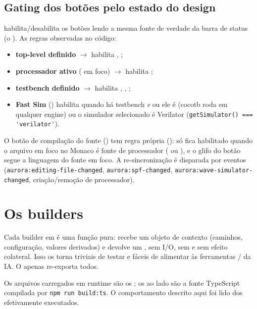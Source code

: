\subsection{Gating dos botões pelo estado do design}
\label{sec:08-gating}

 habilita/desabilita os botões lendo a mesma fonte
de verdade da barra de status (o ). As regras observadas no
código:

\begin{itemize}[leftmargin=1.4em]
  \item \textbf{top-level definido} $\to$ habilita ,
    ;
  \item \textbf{processador ativo} ( em foco) $\to$ habilita
    ;
  \item \textbf{testbench definido} $\to$ habilita ,
    , ;
  \item \textbf{Fast Sim} () habilita quando há testbench
    \emph{e} ou ele é  (cocotb roda em qualquer engine) ou o simulador
    selecionado é Verilator (\lstinline|getSimulator() === 'verilator'|).
\end{itemize}

\noindent O botão de compilação do fonte () tem regra própria
(): só fica habilitado quando o arquivo em foco no
Monaco é fonte de processador ( ou ), e o glifo do botão
segue a linguagem do fonte em foco. A re-sincronização é disparada por eventos
(\lstinline|aurora:editing-file-changed|, \lstinline|aurora:spf-changed|,
\lstinline|aurora:wave-simulator-changed|, criação/remoção de processador).

\section{Os builders}
\label{sec:08-builders}

Cada builder em  é uma função pura: recebe um
objeto de contexto (caminhos, configuração, valores derivados) e devolve um
, sem I/O, sem  e sem efeito colateral. Isso os
torna triviais de testar e fáceis de alimentar às ferramentas
 /  da IA. O
 apenas re-exporta todos.

\begin{nota}
Os arquivos carregados em runtime são os ; os  ao lado são a
fonte TypeScript compilada por \lstinline|npm run build:ts|. O comportamento
descrito aqui foi lido dos  efetivamente executados.
\end{nota}

